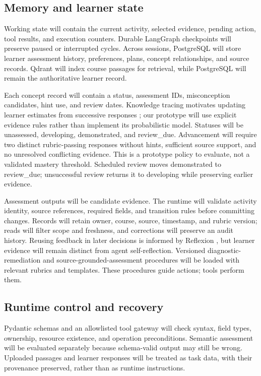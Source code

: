 \documentclass{article}
\begin{document}
\subsection{Memory and learner state}

Working state will contain the current activity, selected evidence, pending action, tool results, and execution counters. Durable LangGraph checkpoints will preserve paused or interrupted cycles. Across sessions, PostgreSQL will store learner assessment history, preferences, plans, concept relationships, and source records. Qdrant will index course passages for retrieval, while PostgreSQL will remain the authoritative learner record.

Each concept record will contain a status, assessment IDs, misconception candidates, hint use, and review dates. Knowledge tracing motivates updating learner estimates from successive responses \citep{ref6}; our prototype will use explicit evidence rules rather than implement its probabilistic model. Statuses will be unassessed, developing, demonstrated, and review\_due. Advancement will require two distinct rubric-passing responses without hints, sufficient source support, and no unresolved conflicting evidence. This is a prototype policy to evaluate, not a validated mastery threshold. Scheduled review moves demonstrated to review\_due; unsuccessful review returns it to developing while preserving earlier evidence.

Assessment outputs will be candidate evidence. The runtime will validate activity identity, source references, required fields, and transition rules before committing changes. Records will retain owner, course, source, timestamp, and rubric version; reads will filter scope and freshness, and corrections will preserve an audit history. Reusing feedback in later decisions is informed by Reflexion \citep{ref7}, but learner evidence will remain distinct from agent self-reflection. Versioned diagnostic-remediation and source-grounded-assessment procedures will be loaded with relevant rubrics and templates. These procedures guide actions; tools perform them.

\subsection{Runtime control and recovery}

Pydantic schemas and an allowlisted tool gateway will check syntax, field types, ownership, resource existence, and operation preconditions. Semantic assessment will be evaluated separately because schema-valid output may still be wrong. Uploaded passages and learner responses will be treated as task data, with their provenance preserved, rather than as runtime instructions.
\end{document}

